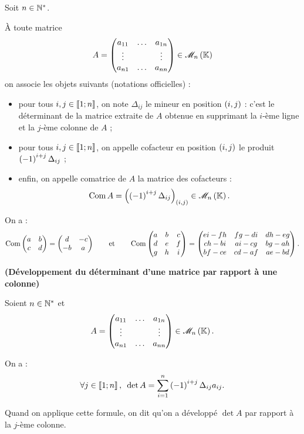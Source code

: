\begin{nota}
Soit \(n\in\mathbb{N}^*\).

À toute matrice \[A=\begin{pmatrix}
a_{11} & \dots & a_{1n} \\
\vdots &  & \vdots \\
a_{n1} & \dots & a_{nn}
\end{pmatrix}\in\M{n}\] on associe les objets suivants (notations officielles) :

\begin{itemize}
    \item pour tous \(i,j\in\left\llbracket1;n\right\rrbracket\), on note \(\Delta_{ij}\) le mineur en position \(\left(i,j\right)\) : c'est le déterminant de la matrice extraite de \(A\) obtenue en supprimant la \(i\)-ème ligne et la \(j\)-ème colonne de \(A\) ; \\
    \item pour tous \(i,j\in\left\llbracket1;n\right\rrbracket\), on appelle cofacteur en position \(\left(i,j\right)\) le produit \(\left(-1\right)^{i+j}\Delta_{ij}\) ; \\
    \item enfin, on appelle comatrice de \(A\) la matrice des cofacteurs : \[\Com{A}=\paren{\paren{-1}^{i+j}\Delta_{ij}}_{\paren{i,j}}\in\M{n}.\]
\end{itemize}
\end{nota}

\begin{ex}
On a : \[\operatorname{Com}\begin{pmatrix}
a & b \\
c & d
\end{pmatrix}=\begin{pmatrix}
d & -c \\
-b & a
\end{pmatrix}\qquad\text{et}\qquad\operatorname{Com}\begin{pmatrix}
a & b & c \\
d & e & f \\
g & h & i
\end{pmatrix}=\begin{pmatrix}
ei-fh & fg-di & dh-eg \\
ch-bi & ai-cg & bg-ah \\
bf-ce & cd-af & ae-bd
\end{pmatrix}.\]
\end{ex}

\begin{prop}
{\normalfont\bfseries (Développement du déterminant d'une matrice par rapport à une colonne)}

Soient \(n\in\mathbb{N}^*\) et \[A=\begin{pmatrix}
a_{11} & \dots & a_{1n} \\
\vdots &  & \vdots \\
a_{n1} & \dots & a_{nn}
\end{pmatrix}\in\M{n}.\]

On a : \[\quantifs{\forall j\in\interventierii{1}{n}}\det A=\sum_{i=1}^n\paren{-1}^{i+j}\Delta_{ij}a_{ij}.\]

Quand on applique cette formule, on dit qu'on a développé \(\det A\) par rapport à la \(j\)-ème colonne.
\end{prop}

